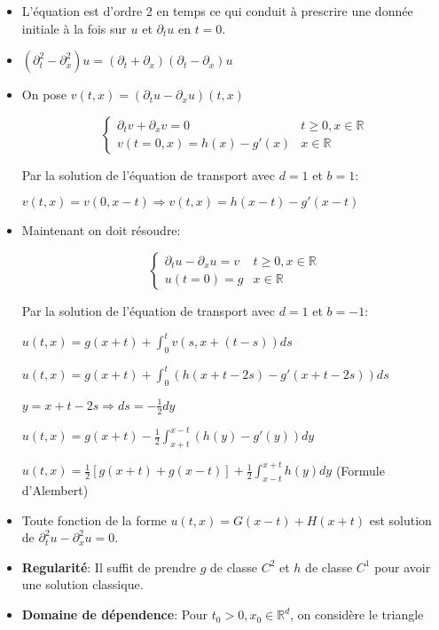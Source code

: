 \documentclass[10pt,a4paper,oneside]{article}
\begin{document}
\begin{itemize}
\item
L'équation est d'ordre 2 en temps ce qui conduit à prescrire une donnée initiale à la fois sur $u$ et $\partial_t u$ en $t = 0$.

\item
$(\partial^2_t - \partial^2_x)u = (\partial_t + \partial_x)(\partial_t - \partial_x)u$

\item
On pose $v(t,x) = (\partial_t u - \partial_x u)(t,x)$

\[ \begin{cases}
\partial_t v + \partial_x v = 0 & t \geq 0, x \in \mathbb{R} \\
v(t = 0,x) = h(x) - g'(x) & x \in \mathbb{R}
\end{cases} \]

Par la solution de l'équation de transport avec $d = 1$ et $b = 1$:

$v(t,x) = v(0,x - t) \Rightarrow \boxed{v(t,x) = h(x - t) - g'(x - t)}$

\item
Maintenant on doit résoudre:

\[ \begin{cases}
\partial_t u - \partial_x u = v & t \geq 0, x \in \mathbb{R} \\
u(t = 0) = g & x \in \mathbb{R}
\end{cases} \]

Par la solution de l'équation de transport avec $d = 1$ et $b = -1$:

$u(t,x) = g(x + t) + \int_{0}^t v(s,x + (t - s)) ds$

$u(t,x) = g(x + t) + \int_{0}^t (h(x + t - 2s) - g'(x + t - 2s)) ds$

$y = x + t - 2s \Rightarrow ds = -\frac{1}{2}dy$

$u(t,x) = g(x + t) - \frac{1}{2} \int_{x + t}^{x - t} (h(y) - g'(y)) dy$

$\boxed{u(t,x) = \frac{1}{2}[g(x + t) + g(x - t)] + \frac{1}{2} \int_{x - t}^{x + t} h(y)dy}$ (Formule d'Alembert)

\item
Toute fonction de la forme $u(t,x) = G(x - t) + H(x + t)$ est solution de $\partial^2_t u - \partial^2_x u = 0$.

\item
\textbf{Regularité}: Il suffit de prendre $g$ de classe $C^2$ et $h$ de classe $C^1$ pour avoir une solution classique.

\item
\textbf{Domaine de dépendence}: Pour $t_0 > 0, x_0 \in \mathbb{R}^d$, on considère le triangle


\end{itemize}
\end{document}

